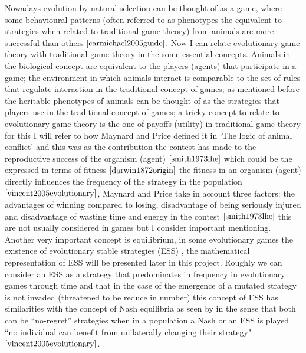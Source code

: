 Nowadays evolution by natural selection can be thought of as a game, where some behavioural patterns (often referred to as phenotypes the equivalent to strategies when related to traditional game theory) from animals are more successful than others $\cite{carmichael2005guide}$. Now I can relate evolutionary game theory with traditional game theory in the some essential concepts. Animals in the biological concept are equivalent to the players (agents) that participate in a game; the environment in which animals interact is comparable to the set of rules that regulate interaction in the traditional concept of games; as mentioned before the heritable phenotypes of animals can be thought of as the strategies that players use in the traditional concept of games; a tricky concept to relate to evolutionary game theory is the one of payoffs (utility) in traditional game theory  for this I will refer to how Maynard and Price defined it in `The logic of animal conflict' and this was as the contribution the contest has made to the reproductive success of the organism (agent) $\cite{smith1973lhe}$ which could be the expressed in terms of fitness  $\cite{darwin1872origin}$ the fitness in an organism (agent) directly influences the frequency of the strategy in the population $\cite{vincent2005evolutionary}$, Maynard and Price take in account three factors: the advantages of winning compared to losing, disadvantage of being seriously injured and disadvantage of wasting time and energy in the contest $\cite{smith1973lhe}$ this are not usually considered in games but I consider important mentioning. Another very important concept is equilibrium, in some evolutionary games the existence of evolutionary stable strategies (ESS) , the mathematical representation of  ESS will be presented later in this project. Roughly we can consider an ESS as a strategy that predominates in frequency in evolutionary games through time and that in the case of the emergence of a mutated strategy is not invaded (threatened to be reduce in number) this concept of ESS has similarities with the concept of Nash equilibria as seen by in the sense that both can be ``no-regret'' strategies when in a population a Nash or an ESS is played ``no individual can benefit from unilaterally changing their strategy" $\cite{vincent2005evolutionary}$.  

